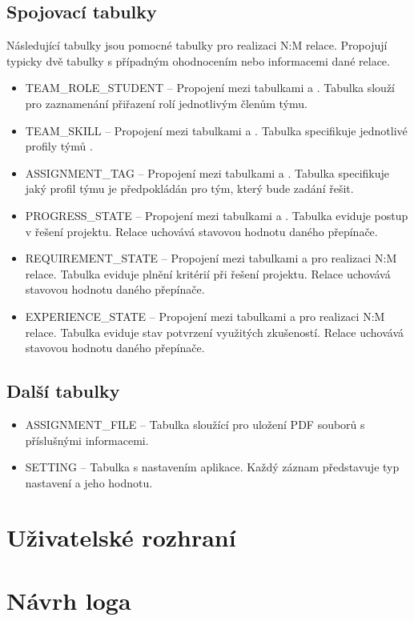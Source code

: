 \documentclass[czech,BP]{thesiskiv}
\begin{document}
		\subsection{Spojovací tabulky}
			\par Následující tabulky jsou pomocné tabulky pro realizaci N:M relace. Propojují typicky dvě tabulky s případným ohodnocením nebo informacemi dané relace.
			\begin{itemize}
				\item TEAM\_ROLE\_STUDENT -- Propojení mezi tabulkami  a . Tabulka slouží pro zaznamenání přiřazení rolí jednotlivým členům týmu.
				\item TEAM\_SKILL -- Propojení mezi tabulkami  a . Tabulka specifikuje jednotlivé profily týmů .
				\item ASSIGNMENT\_TAG -- Propojení mezi tabulkami  a . Tabulka specifikuje jaký profil týmu je předpokládán pro tým, který bude zadání řešit.
				\item PROGRESS\_STATE -- Propojení mezi tabulkami  a . Tabulka eviduje postup v řešení projektu. Relace uchovává stavovou hodnotu daného přepínače.
				\item REQUIREMENT\_STATE -- Propojení mezi tabulkami  a  pro realizaci N:M relace. Tabulka eviduje plnění kritérií při řešení projektu. Relace uchovává stavovou hodnotu daného přepínače.
				\item EXPERIENCE\_STATE -- Propojení mezi tabulkami  a  pro realizaci N:M relace. Tabulka eviduje stav potvrzení využitých zkušeností. Relace uchovává stavovou hodnotu daného přepínače.
			\end{itemize}
		\subsection{Další tabulky}
			\begin{itemize}
				\item ASSIGNMENT\_FILE -- Tabulka sloužící pro uložení PDF souborů s příslušnými informacemi.
				\item SETTING -- Tabulka s nastavením aplikace. Každý záznam představuje typ nastavení a jeho hodnotu.
			\end{itemize}
	\section{Uživatelské rozhraní}
	\section{Návrh loga}
\end{document}
